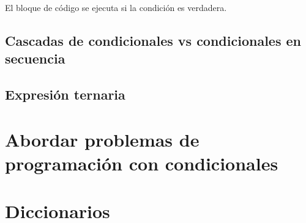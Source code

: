 El bloque de código se ejecuta si la condición es verdadera.




\subsection{Cascadas de condicionales vs condicionales en secuencia}

\subsection{Expresión ternaria}

\section{Abordar problemas de programación con condicionales}




\section{Diccionarios}

